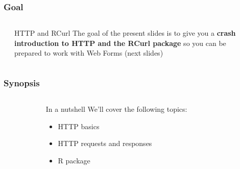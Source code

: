 \documentclass{beamer}\usepackage[]{graphicx}\usepackage[]{color}
\begin{document}
\begin{frame}
\frametitle{Goal}

\begin{columns}[t]
\begin{column}{0.1\textwidth}
\end{column}
\begin{column}{0.8\textwidth}

\begin{block}{HTTP and RCurl}
The goal of the present slides is to give you a \textbf{crash introduction to HTTP and the RCurl package} so you can be prepared to work with Web Forms (next slides)
\end{block}

\end{column}
\begin{column}{0.1\textwidth}
\end{column}
\end{columns}

\end{frame}


\begin{frame}
\frametitle{Synopsis}

\begin{columns}[t]
\begin{column}{0.1\textwidth}
\end{column}
\begin{column}{0.8\textwidth}

\begin{block}{In a nutshell}
We'll cover the following topics:
\begin{itemize}
 \item HTTP basics
 \item HTTP requests and responses
 \item R package 
\end{itemize}
\end{block}

\end{column}
\begin{column}{0.1\textwidth}
\end{column}
\end{columns}

\end{frame}

\end{document}
